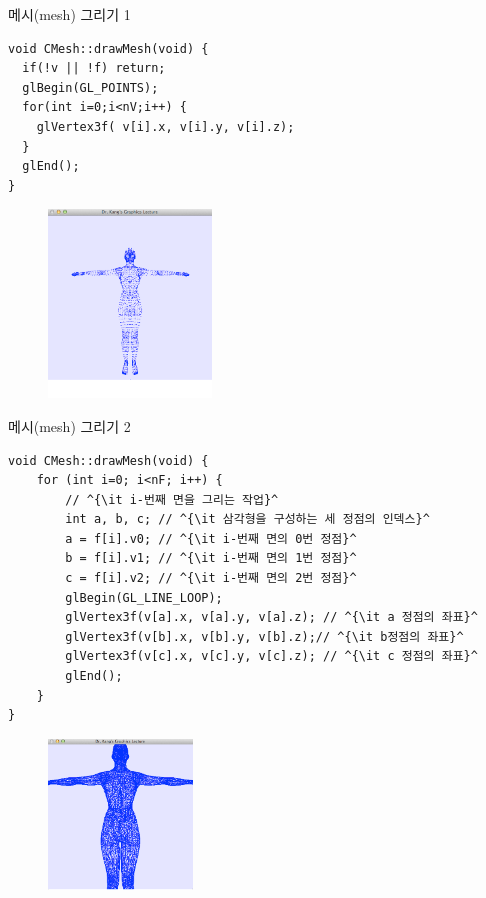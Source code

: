 \documentclass{beamer}
\begin{document}
\begin{frame}[fragile]{메시(mesh) 그리기 1}

\lstset{language=C++, escapechar=^} 
\begin{lstlisting}
void CMesh::drawMesh(void) {
  if(!v || !f) return;
  glBegin(GL_POINTS);
  for(int i=0;i<nV;i++) {
    glVertex3f( v[i].x, v[i].y, v[i].z);
  }
  glEnd();
}
\end{lstlisting}

\begin{figure}[h!]
  \centering
    \includegraphics[height=5cm]{OGL_light/drawMeshVerts.png}
\end{figure}

\end{frame}

\begin{frame}[fragile]{메시(mesh) 그리기 2}

\lstset{language=C++, escapechar=^} 
\begin{lstlisting}
void CMesh::drawMesh(void) {
    for (int i=0; i<nF; i++) {
        // ^{\it i-번째 면을 그리는 작업}^
        int a, b, c; // ^{\it 삼각형을 구성하는 세 정점의 인덱스}^
        a = f[i].v0; // ^{\it i-번째 면의 0번 정점}^
        b = f[i].v1; // ^{\it i-번째 면의 1번 정점}^
        c = f[i].v2; // ^{\it i-번째 면의 2번 정점}^
        glBegin(GL_LINE_LOOP);
        glVertex3f(v[a].x, v[a].y, v[a].z); // ^{\it a 정점의 좌표}^
        glVertex3f(v[b].x, v[b].y, v[b].z);// ^{\it b정점의 좌표}^
        glVertex3f(v[c].x, v[c].y, v[c].z); // ^{\it c 정점의 좌표}^
        glEnd();
    }
}
\end{lstlisting}

\begin{figure}[h!]
  \centering
    \includegraphics[height=4cm]{OGL_light/meshEdgeDraw.png}
\end{figure}

\end{frame}
\end{document}
